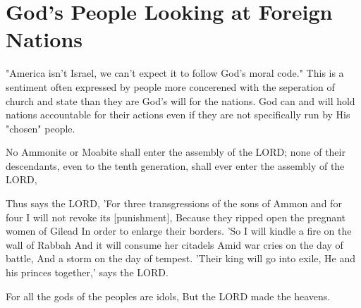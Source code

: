 \vspace{2\baselineskip}

\vspace{2\baselineskip}



\section{God's People Looking at Foreign Nations}
"America isn't Israel, we can't expect it to follow God's moral code."  This is a sentiment often expressed by people more concerened with the seperation of church and state than they are God's will for the nations.
God can and will hold nations accountable for their actions even if they are not specifically run by His "chosen" people. 

\begin{scripture}[Deuteronomy 23:3]
    No Ammonite or Moabite shall enter the assembly of the LORD; none of their descendants, even to the tenth generation, shall ever enter the assembly of the LORD,
\end{scripture}

\begin{scripture}[Amos 1:13-15]
    Thus says the LORD, 'For three transgressions of the sons of Ammon and for four I will not revoke its [punishment], Because they ripped open the pregnant women of Gilead In order to enlarge their borders.
    'So I will kindle a fire on the wall of Rabbah And it will consume her citadels Amid war cries on the day of battle, And a storm on the day of tempest.
    'Their king will go into exile, He and his princes together,' says the LORD. 
\end{scripture}

\vspace{2\baselineskip}

\begin{scripture}[Psalm 96:5]
     
    For all the gods of the peoples are idols, But the LORD made the heavens.
\end{scripture}

